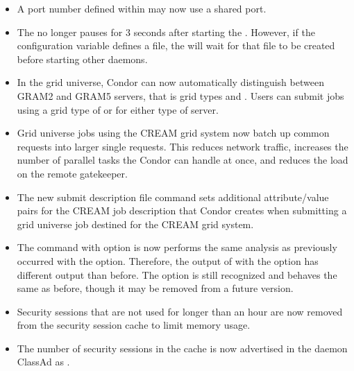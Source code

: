 \begin{itemize}

\item A port number defined within  may now use 
  a shared port.

\item The  no longer pauses for 3 seconds after starting
  the .  However, if the configuration variable
   defines a file, 
  the  will wait for that file to be created
  before starting other daemons.

\item In the grid universe, Condor can now automatically distinguish
between GRAM2 and GRAM5 servers, that is grid types  and
.
Users can submit jobs using a grid type of  or 
for either type of server.

\item Grid universe jobs using the CREAM grid system now batch up
common requests into larger single requests.  This
reduces network traffic, increases the number of parallel tasks
the Condor can handle at once, and reduces the load on the remote
gatekeeper.

\item The new submit description file command 
sets additional attribute/value pairs for the CREAM job description
that Condor creates when submitting a grid universe job 
destined for the CREAM grid system.

\item The  command with option  is now performs
the same analysis as previously occurred with the  option.
Therefore, the output of  with the  option
has different output than before.
The  option is still recognized and behaves the same
as before, though it may be removed from a future version.

\item Security sessions that are not used for longer than an hour are
now removed from the security session cache to limit memory usage.

\item The number of security sessions in the cache is now advertised in
the daemon ClassAd as .


\end{itemize}
